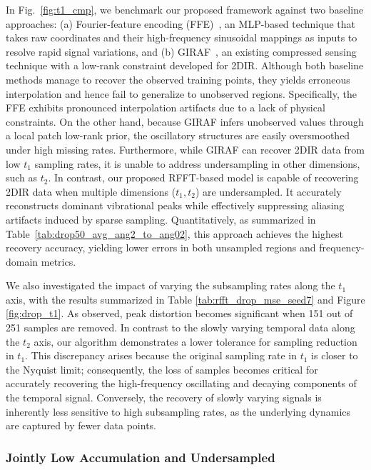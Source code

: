 \documentclass{optica-article}
\begin{document}
In Fig.~\ref{fig:t1_cmp}, we benchmark our proposed framework against two baseline approaches: (a) Fourier-feature encoding (FFE)~\cite{tancik2020fourier}, an MLP-based technique that takes raw coordinates and their high-frequency sinusoidal mappings as inputs to resolve rapid signal variations, and (b) GIRAF~\cite{bhattacharya2017accelerating}, an existing compressed sensing technique with a low-rank constraint developed for 2DIR. Although both baseline methods manage to recover the observed training points, they yields erroneous interpolation and hence fail to generalize to unobserved regions. Specifically, the FFE exhibits pronounced interpolation artifacts due to a lack of physical constraints. On the other hand, because GIRAF infers unobserved values through a local patch low-rank prior, the oscillatory structures are easily oversmoothed under high missing rates. Furthermore, while GIRAF can recover 2DIR data from low $t_1$ sampling rates, it is unable to address undersampling in other dimensions, such as $t_2$. In contrast, our proposed RFFT-based model is capable of recovering 2DIR data when multiple dimensions ($t_1,t_2$) are undersampled. It accurately reconstructs dominant vibrational peaks while effectively suppressing aliasing artifacts induced by sparse sampling. Quantitatively, as summarized in Table~\ref{tab:drop50_avg_ang2_to_ang02}, this approach achieves the highest recovery accuracy, yielding lower errors in both unsampled regions and frequency-domain metrics.

We also investigated the impact of varying the subsampling rates along the $t_1$ axis, with the results summarized in Table \ref{tab:rfft_drop_mse_seed7} and Figure \ref{fig:drop_t1}. As observed, peak distortion becomes significant when 151 out of 251 samples are removed. In contrast to the slowly varying temporal data along the $t_2$ axis, our algorithm demonstrates a lower tolerance for sampling reduction in $t_1$. This discrepancy arises because the original sampling rate in $t_1$ is closer to the Nyquist limit; consequently, the loss of samples becomes critical for accurately recovering the high-frequency oscillating and decaying components of the temporal signal. Conversely, the recovery of slowly varying signals is inherently less sensitive to high subsampling rates, as the underlying dynamics are captured by fewer data points.

\subsubsection{Jointly Low Accumulation and Undersampled}
\end{document}
